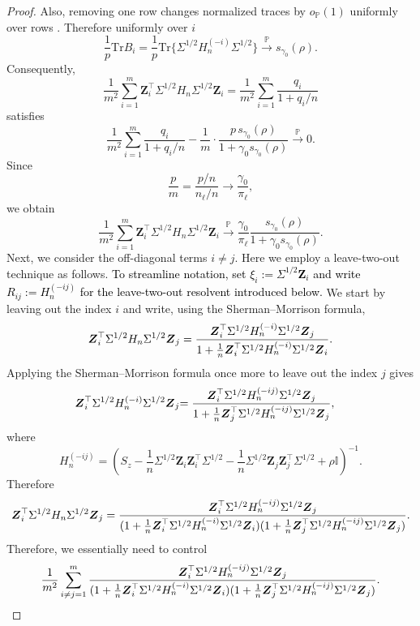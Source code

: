 \documentclass{article}
\theoremstyle{plain}
\theoremstyle{remark}
\def \bZ{\mathbf{Z}}
\def \tr {\mathrm{Tr}}
\def \I{\mathcal{I}}
\def \P{\mathbb{P}}
\def \bZ {{\boldsymbol{Z}}}
\def \I {\mathbb{I}}
\begin{document}
\begin{proof}
Also, removing one row changes normalized traces by \(o_{\P}(1)\) uniformly over rows \citep[Theorem A.43]{bai2010spectral}. Therefore uniformly over $i$
\[
\frac1p\tr B_i
=
\frac1p\tr\{\Sigma^{1/2}H_n^{(-i)}\Sigma^{1/2}\}
\stackrel{\P}{\to}
s_{\gamma_0}(\rho).
\]
Consequently,
\[
\frac1{m^2}
\sum_{i=1}^m
\bZ_i^\top\Sigma^{1/2}H_n\Sigma^{1/2}\bZ_i
=
\frac1{m^2}
\sum_{i=1}^m
\frac{q_i}{1+q_i/n}
\]
satisfies
\[
\frac1{m^2}
\sum_{i=1}^m
\frac{q_i}{1+q_i/n}
-
\frac1m
\cdot
\frac{p\,s_{\gamma_0}(\rho)}
{1+\gamma_0s_{\gamma_0}(\rho)}\stackrel{\P}{\to} 0.
\]
Since
\[
\frac pm
=
\frac{p/n}{n_\ell/n}
\to
\frac{\gamma_0}{\pi_\ell},
\]
we obtain
\[
\frac1{m^2}
\sum_{i=1}^m
\bZ_i^\top\Sigma^{1/2}H_n\Sigma^{1/2}\bZ_i
\stackrel{\P}{\to}
\frac{\gamma_0}{\pi_\ell}
\frac{s_{\gamma_0}(\rho)}
{1+\gamma_0s_{\gamma_0}(\rho)}.
\]
Next, we consider the off-diagonal terms \(i\ne j\). Here we employ a leave-two-out technique as follows. \textcolor{black}{To streamline notation, set $\xi_i:=\Sigma^{1/2}\bZ_i$ and write $R_{ij}:=H_n^{(-ij)}$ for the leave-two-out resolvent introduced below.} We start by leaving out the index $i$ and write, using the Sherman--Morrison formula,
\begin{align*}
\bZ_i^\top\Sigma^{1/2}H_n\Sigma^{1/2}\textcolor{black}{\bZ_j}=\frac{\bZ_i^\top \Sigma^{1/2}H_n^{(-i)}\Sigma^{1/2}\bZ_j}{1+\tfrac{1}{n}\bZ_i^\top\Sigma^{1/2} H_n^{(-i)}\Sigma^{1/2}\bZ_i}.
\end{align*}
Applying the Sherman--Morrison formula once more to leave out the index $j$ gives
\begin{align*}
  \textcolor{black}{\bZ_i^\top\Sigma^{1/2} H_n^{(-i)}\Sigma^{1/2}\bZ_j}&\textcolor{black}{=\frac{\bZ_i^\top\Sigma^{1/2} H_n^{(-ij)}\Sigma^{1/2}\bZ_j}{1+\tfrac{1}{n}\bZ_j^\top \Sigma^{1/2}H_n^{(-ij)}\Sigma^{1/2}\bZ_j},}
\end{align*}
where
\[
H_n^{(-ij)}
=
\left(
S_z-\frac1n\Sigma^{1/2}\bZ_i\bZ_i^\top\Sigma^{1/2}-\frac1n\Sigma^{1/2}\bZ_j\bZ_j^\top\Sigma^{1/2}
+\rho \I
\right)^{-1}.
\]
Therefore
\begin{align*}
    \textcolor{black}{\bZ_i^\top\Sigma^{1/2}H_n\Sigma^{1/2}\bZ_j=\frac{\bZ_i^\top\Sigma^{1/2} H_n^{(-ij)}\Sigma^{1/2}\bZ_j}{(1+\tfrac{1}{n}\bZ_i^\top\Sigma^{1/2} H_n^{(-i)}\Sigma^{1/2}\bZ_i)(1+\tfrac{1}{n}\bZ_j^\top\Sigma^{1/2} H_n^{(-ij)}\Sigma^{1/2}\bZ_j)}.}
\end{align*}
Therefore, we essentially need to control
\begin{align*}
    \textcolor{black}{\frac{1}{m^2}\sum\limits_{i\neq j=1}^m \frac{\bZ_i^\top\Sigma^{1/2} H_n^{(-ij)}\Sigma^{1/2}\bZ_j}{(1+\tfrac{1}{n}\bZ_i^\top\Sigma^{1/2} H_n^{(-i)}\Sigma^{1/2}\bZ_i)(1+\tfrac{1}{n}\bZ_j^\top\Sigma^{1/2} H_n^{(-ij)}\Sigma^{1/2}\bZ_j)}.}

\end{align*}
\end{proof}
\end{document}
